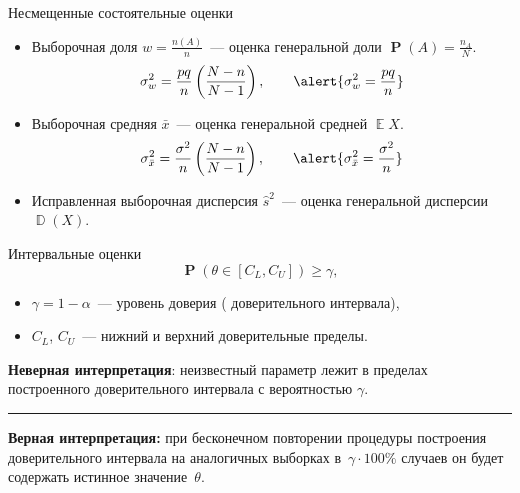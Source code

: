 \documentclass[11pt,pdf,utf8,hyperref={unicode},aspectratio=169]{beamer}
\DeclareMathOperator{\DD}{\mathbb{D}}
\DeclareMathOperator{\EE}{\mathbb{E}}
\DeclareMathOperator{\prob}{\mathbf{P}}
\begin{document}
\begin{frame}{Несмещенные состоятельные оценки}{}
    \begin{itemize}
        \item Выборочная доля $w = \frac{n(A)}{n}$~--- оценка генеральной доли $\prob(A) = \frac{n_A}{N}$.
            $$
                \sigma_w^2=\frac{pq}{n}\left(\frac{N-n}{N-1}\right),
                \qquad
                \alert{\sigma_w^2= \frac{pq}{n}}
            $$
        \item Выборочная средняя $\bar{x}$~--- оценка генеральной средней $\EE{X}$.
            $$
                \sigma_{\bar{x}}^2=\frac{\sigma^2}{n}\left(\frac{N-n}{N-1}\right),
                \qquad
                \alert{\sigma_{\bar{x}}^2=\frac{\sigma^2}{n}}
            $$
        \item Исправленная выборочная дисперсия $\hat{s}^2$~--- оценка генеральной дисперсии $\DD(X)$.
    \end{itemize}

\end{frame}
\begin{frame}{Интервальные оценки}
%
    $$
        \prob\left(\theta \in \left[C_L, C_U\right]\right)\geqslant \gamma,
    $$
    \begin{itemize}
    \item $\gamma = 1-\alpha$~--- уровень доверия ( доверительного интервала),
    \item $C_L$, $C_U$~--- нижний и верхний доверительные пределы.
    \end{itemize}
    \bigskip

	\textbf{Неверная интерпретация}: неизвестный параметр лежит в пределах построенного доверительного интервала с вероятностью $\gamma$.

	\bigskip
    \hrule

    \medskip

    \textbf{Верная интерпретация:} при бесконечном повторении процедуры построения доверительного интервала на аналогичных выборках в~$\gamma\cdot 100\%$ случаев он будет содержать истинное значение~$\theta$.
\end{frame}
\end{document}
